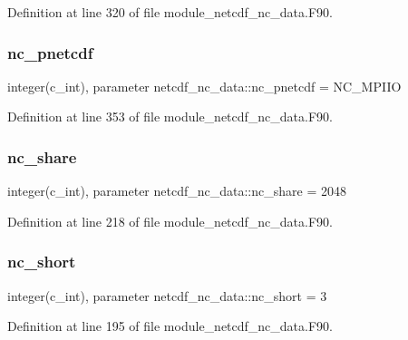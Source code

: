 Definition at line 320 of file module\+\_\+netcdf\+\_\+nc\+\_\+data.\+F90.

\mbox{\label{namespacenetcdf__nc__data_a942139d2e6086ea7b93c55f690440d91}} 
\subsubsection{\texorpdfstring{nc\+\_\+pnetcdf}{nc\_pnetcdf}}
{\footnotesize\ttfamily integer(c\+\_\+int), parameter netcdf\+\_\+nc\+\_\+data\+::nc\+\_\+pnetcdf = N\+C\+\_\+\+M\+P\+I\+IO}



Definition at line 353 of file module\+\_\+netcdf\+\_\+nc\+\_\+data.\+F90.

\mbox{\label{namespacenetcdf__nc__data_af9e4915085fa53a31b8abefaa2777261}} 
\subsubsection{\texorpdfstring{nc\+\_\+share}{nc\_share}}
{\footnotesize\ttfamily integer(c\+\_\+int), parameter netcdf\+\_\+nc\+\_\+data\+::nc\+\_\+share = 2048}



Definition at line 218 of file module\+\_\+netcdf\+\_\+nc\+\_\+data.\+F90.

\mbox{\label{namespacenetcdf__nc__data_a432fdf219e0ef17a34c2598005514bb4}} 
\subsubsection{\texorpdfstring{nc\+\_\+short}{nc\_short}}
{\footnotesize\ttfamily integer(c\+\_\+int), parameter netcdf\+\_\+nc\+\_\+data\+::nc\+\_\+short = 3}



Definition at line 195 of file module\+\_\+netcdf\+\_\+nc\+\_\+data.\+F90.

